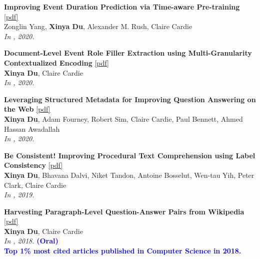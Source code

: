 \begin{enumerate}[{[}1{]},resume,leftmargin=*]
\parbox{\linewidth}{
\item
{\bf Improving Event Duration Prediction via Time-aware Pre-training}
\href{https://aclanthology.org/2020.findings-emnlp.302.pdf}{{[pdf]}} \\
{Zonglin Yang, \textbf{Xinya Du}, Alexander M. Rush, Claire Cardie} \\
{\it In \EMNLPfinding, 2020.}\\
}

\parbox{\linewidth}{
\item
{\bf Document-Level Event Role Filler Extraction using Multi-Granularity Contextualized Encoding}
\href{https://aclanthology.org/2020.acl-main.714.pdf}{{[pdf]}} \\
{\textbf{Xinya Du}, Claire Cardie} \\
{\it In \ACL, 2020.}\\
}

\parbox{\linewidth}{
\item
{\bf Leveraging Structured Metadata for Improving Question Answering on the Web}
\href{https://aclanthology.org/2020.aacl-main.55.pdf}{{[pdf]}} \\
{\textbf{Xinya Du}, Adam Fourney, Robert Sim, Claire Cardie, Paul Bennett, Ahmed Hassan Awadallah} \\
{\it In \AACL, 2020.}\\
}

\parbox{\linewidth}{
\item
{\bf Be Consistent! Improving Procedural Text Comprehension using Label Consistency}
\href{https://aclanthology.org/N19-1244.pdf}{{[pdf]}} \\
{\textbf{Xinya Du}, Bhavana Dalvi, Niket Tandon, Antoine Bosselut, Wen-tau Yih, Peter Clark, Claire Cardie} \\
{\it In \NAACL, 2019.}\\
}

\parbox{\linewidth}{
\item\label{pub:harvest}
{\bf Harvesting Paragraph-Level Question-Answer Pairs from Wikipedia}
\href{https://aclanthology.org/P18-1177.pdf}{{[pdf]}} \\
{{\bf Xinya Du}, Claire Cardie} \\
{\it In \ACL, 2018.} {\textcolor{blue}{\textbf{(Oral)}}}  \\
{\textcolor{blue}{\textbf{Top 1\% most cited articles published in Computer Science in 2018.}}} \\
}


\end{enumerate}
